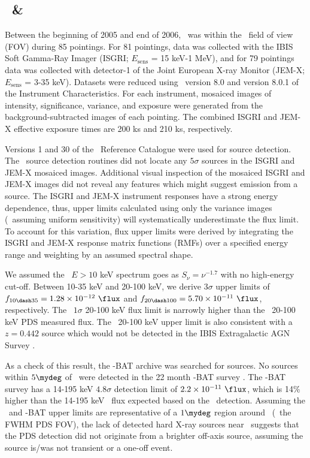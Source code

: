\documentclass[useAMS,usenatbib]{mn2e}
\begin{document}
\subsection{\integral\ \& \swift}
\label{sec:integral}

Between the beginning of 2005 and end of 2006, \irs\ was within the
\integral\ field of view (FOV) during 85 pointings. For 81 pointings,
data was collected with the IBIS Soft Gamma-Ray Imager (ISGRI;
$E_{\mathrm{sens}}$ = 15 keV-1 MeV), and for 79 pointings data was
collected with detector-1 of the Joint European X-ray Monitor (JEM-X;
$E_{\mathrm{sens}}$ = 3-35 keV). Datasets were reduced using
\osa\ version 8.0 and version 8.0.1 of the Instrument
Characteristics. For each instrument, mosaiced images of intensity,
significance, variance, and exposure were generated from the
background-subtracted images of each pointing. The combined ISGRI and
JEM-X effective exposure times are 200 ks and 210 ks, respectively.

Versions 1 and 30 of the \integral\ Reference Catalogue were used for
source detection. The \osa\ source detection routines did not locate
any $5\sigma$ sources in the ISGRI and JEM-X mosaiced
images. Additional visual inspection of the mosaiced ISGRI and JEM-X
images did not reveal any features which might suggest emission from a
source. The ISGRI and JEM-X instrument responses have a strong energy
dependence, thus, upper limits calculated using only the variance
images (\ie\ assuming uniform sensitivity) will systematically
underestimate the flux limit. To account for this variation, flux
upper limits were derived by integrating the ISGRI and JEM-X response
matrix functions (RMFs) over a specified energy range and weighting by
an assumed spectral shape.

We assumed the \irs\ $E> 10$ keV spectrum goes as $S_{\nu} =
\nu^{-1.7}$ with no high-energy cut-off. Between 10-35 keV and 20-100
keV, we derive $3\sigma$ upper limits of $f_{10 \dash 35} = 1.28
\times 10^{-12} ~\flux$ and $f_{20 \dash 100} = 5.70 \times 10^{-11}
~\flux$, respectively. The \integral\ $1\sigma$ 20-100 keV flux limit
is narrowly higher than the \bepposax\ 20-100 keV PDS measured
flux. The \integral\ 20-100 keV upper limit is also consistent with a
$z = 0.442$ source which would not be detected in the IBIS
Extragalactic AGN Survey \citep{2006ApJ...636L..65B}.

As a check of this result, the \swift-BAT archive was searched for
sources. No sources within $5\mydeg$ of \irs\ were detected in the 22
month \swift-BAT survey \citep{2010ApJS..186..378T}. The \swift-BAT
survey has a 14-195 keV $4.8\sigma$ detection limit of $2.2 \times
10^{-11} ~\flux$, which is 14\% higher than the 14-195 keV \irs\ flux
expected based on the \bepposax\ detection. Assuming the
\integral\ and \swift-BAT upper limits are representative of a
$1\mydeg$ region around \irs\ (\ie\ the FWHM PDS FOV), the lack of
detected hard X-ray sources near \irs\ suggests that the PDS detection
did not originate from a brighter off-axis source, assuming the source
is/was not transient or a one-off event.
\end{document}
